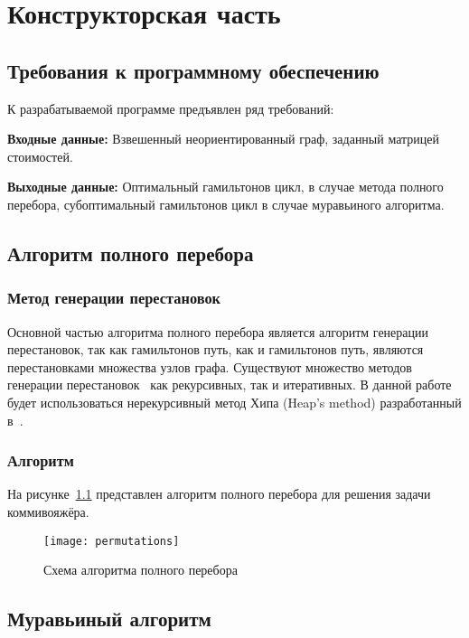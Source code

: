 \chapter{Конструкторская часть}

\section{Требования к программному обеспечению}

К разрабатываемой программе предъявлен ряд требований:

\textbf{Входные данные:} Взвешенный неориентированный граф, заданный матрицей стоимостей.

\textbf{Выходные данные:} Оптимальный гамильтонов цикл, в случае метода полного перебора, субоптимальный гамильтонов цикл в случае муравьиного алгоритма.

\section{Алгоритм полного перебора}

\subsection{Метод генерации перестановок}

Основной частью алгоритма полного перебора является алгоритм генерации перестановок, так как гамильтонов путь, как и гамильтонов путь, являются перестановками множества узлов графа. Существуют множество методов генерации перестановок~\cite{perms} как рекурсивных, так и итеративных. 
В данной работе будет использоваться нерекурсивный метод Хипа (Heap's method) разработанный в~\cite{perms-methods}.

\subsection{Алгоритм}

На рисунке~\ref{fig:permutations} представлен алгоритм полного перебора для решения задачи коммивояжёра.

\begin{figure}[h]
	\centering
	\texttt{[image: permutations]}
	\caption{Схема алгоритма полного перебора}
	\label{fig:permutations}
\end{figure}

\clearpage

\section{Муравьиный алгоритм}

